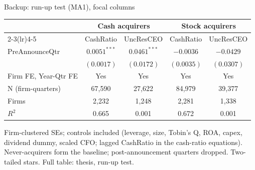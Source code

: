 \documentclass[aspectratio=169, 11pt]{beamer}
\begin{document}
\begin{frame}[noframenumbering]{Backup: run-up test (MA1), focal columns}
  \begin{center}
  \small
  \begin{tabular}{lcccc}
    \toprule
    & \multicolumn{2}{c}{Cash acquirers} & \multicolumn{2}{c}{Stock acquirers} \\
    \cmidrule(lr){2-3}\cmidrule(lr){4-5}
    & CashRatio & UncResCEO & CashRatio & UncResCEO \\
    \midrule
    PreAnnounceQtr & $\mathbf{0.0051}^{***}$ & $\mathbf{0.0461}^{***}$ & $-0.0036$ & $-0.0429$ \\
    & $(0.0017)$ & $(0.0172)$ & $(0.0035)$ & $(0.0307)$ \\
    \midrule
    Firm FE, Year-Qtr FE & Yes & Yes & Yes & Yes \\
    N (firm-quarters) & 67{,}590 & 27{,}622 & 84{,}979 & 39{,}377 \\
    Firms & 2{,}232 & 1{,}248 & 2{,}281 & 1{,}338 \\
    $R^2$ & 0.665 & 0.001 & 0.672 & 0.001 \\
    \bottomrule
  \end{tabular}
  \end{center}
  \vspace{0.4em}
  {\scriptsize Firm-clustered SEs; controls included (leverage, size, Tobin's Q,
  ROA, capex, dividend dummy, scaled CFO; lagged CashRatio in the cash-ratio
  equations). Never-acquirers form the baseline; post-announcement quarters
  dropped. Two-tailed stars. Full table: thesis, run-up test.}
\end{frame}
\end{document}
